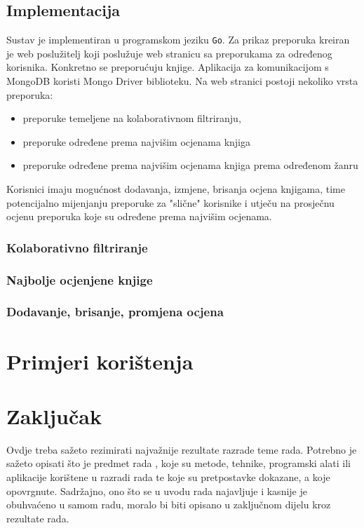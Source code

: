 \documentclass[]{foi}
\begin{document}
\section{Implementacija}

Sustav je implementiran u programskom jeziku \texttt{Go}. Za prikaz preporuka kreiran je web poslužitelj koji poslužuje web stranicu sa preporukama za
određenog korisnika. Konkretno se preporućuju knjige. Aplikacija za komunikacijom s MongoDB koristi Mongo Driver biblioteku.
Na web stranici postoji nekoliko vrsta preporuka:
\begin{itemize}
	\item preporuke temeljene na kolaborativnom filtriranju,
	\item preporuke određene prema najvišim ocjenama knjiga
	\item preporuke određene prema najvišim ocjenama knjiga prema određenom žanru
\end{itemize}
Korisnici imaju mogućnost dodavanja, izmjene, brisanja ocjena knjigama, time potencijalno mijenjanju preporuke za "slične" korisnike
i utječu na prosječnu ocjenu preporuka koje su određene prema najvišim ocjenama.

\subsection{Kolaborativno filtriranje}
\subsection{Najbolje ocjenjene knjige}
\subsection{Dodavanje, brisanje, promjena ocjena}

\chapter{Primjeri korištenja}

\chapter{Zaključak}

Ovdje treba sažeto rezimirati najvažnije rezultate razrade teme rada. Potrebno je sažeto opisati što je predmet rada \cite{copeland2020ArtificialIntelligence}, koje su metode, tehnike, programski alati ili aplikacije korištene u razradi rada te koje su pretpostavke dokazane, a koje opovrgnute. Sadržajno, ono što se u uvodu rada najavljuje i kasnije je obuhvaćeno u samom radu, moralo bi biti opisano u zaključnom dijelu kroz rezultate rada.

\lipsum[1-2]

\makebackmatter
\end{document}
